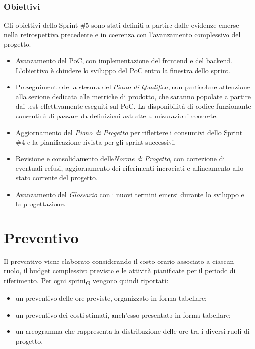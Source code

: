 \documentclass[a4paper, 10pt, colorlinks=true, linkcolor=black, urlcolor=blue, citecolor=blue, hidelinks]{article}
\begin{document}
\subsubsection{Obiettivi}
Gli obiettivi dello Sprint \#5 sono stati definiti a partire dalle evidenze emerse nella retrospettiva precedente e in coerenza con l'avanzamento complessivo del progetto.

\begin{itemize}
    \item  Avanzamento del PoC, con implementazione del frontend e del backend. L'obiettivo è chiudere lo sviluppo del PoC entro la finestra dello sprint.

    \item Proseguimento della stesura del \textit{Piano di Qualifica}, con particolare attenzione alla sezione dedicata alle metriche di prodotto, che saranno popolate a partire dai test effettivamente eseguiti sul PoC. La disponibilità di codice funzionante consentirà di passare da definizioni astratte a misurazioni concrete.

    \item Aggiornamento del \textit{Piano di Progetto} per riflettere i consuntivi dello Sprint \#4 e la pianificazione rivista per gli sprint successivi.

    \item Revisione e consolidamento delle\textit{Norme di Progetto}, con correzione di eventuali refusi, aggiornamento dei riferimenti incrociati e allineamento allo stato corrente del progetto.

    \item Avanzamento del \textit{Glossario} con i nuovi termini emersi durante lo sviluppo e la progettazione.
\end{itemize}

\section{Preventivo}
Il preventivo viene elaborato considerando il costo orario associato a ciascun ruolo, il budget complessivo previsto e le attività pianificate per il periodo di riferimento. Per ogni sprint\textsubscript{G} vengono quindi riportati:

\begin{itemize}
    \item un preventivo delle ore previste, organizzato in forma tabellare;
    \item un preventivo dei costi stimati, anch'esso presentato in forma tabellare;
    \item un areogramma che rappresenta la distribuzione delle ore tra i diversi ruoli di progetto.
\end{itemize}
\end{document}
